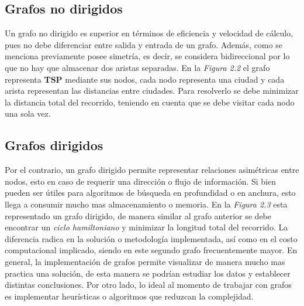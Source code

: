                \newline
                
            \subsection{Grafos no dirigidos}
                Un grafo no dirigido es superior en términos de eficiencia y velocidad de cálculo, pues no debe diferenciar entre salida y entrada de un grafo. Además, como se menciona previamente posee simetría, es decir, se considera bidireccional por lo que no hay que almacenar dos aristas separadas.
                \newline
                \newline
                En la \textit{Figura 2.2} el grafo representa \textbf{TSP} mediante sus nodos, cada nodo representa una ciudad y cada arista representan las distancias entre ciudades. Para resolverlo se debe minimizar la distancia total del recorrido, teniendo en cuenta que se debe visitar cada nodo una sola vez.
                
            \subsection{Grafos dirigidos}
                Por el contrario, un grafo dirigido permite representar relaciones asimétricas entre nodos, esto en caso de requerir una dirección o flujo de información. Si bien pueden ser útiles para algoritmos de búsqueda en profundidad o en anchura, esto llega a consumir mucho mas almacenamiento o memoria.
                \newline
                \newline
                En la \textit{Figura 2.3} esta representado un grafo dirigido, de manera similar al grafo anterior se debe encontrar un \textit{ciclo hamiltoniano} y minimizar la longitud total del recorrido. La diferencia radica en la solución o metodología implementada, así como en el costo computacional implicado, siendo en este segundo grafo frecuentemente mayor.   
                \newline
                \newline
                En general, la implementación de grafos permite visualizar de manera mucho mas practica una solución, de esta manera se podrían estudiar los datos y establecer distintas conclusiones. Por otro lado, lo ideal al momento de trabajar con grafos es implementar heurísticas o algoritmos que reduzcan la complejidad.
                
